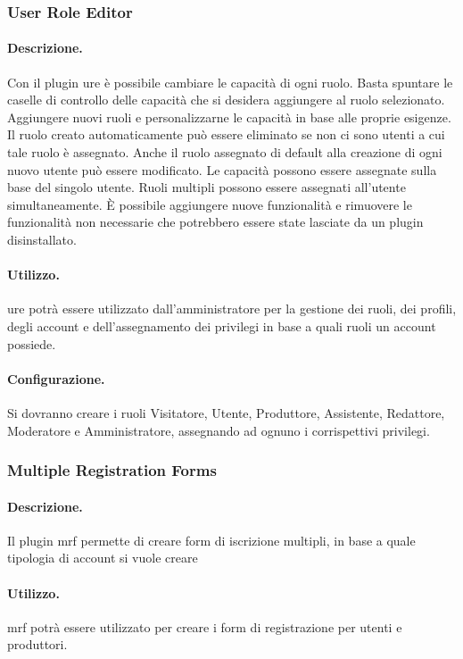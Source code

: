 \subsubsection{User Role Editor}
\paragraph{Descrizione.} Con il plugin \gls{ure} è possibile cambiare le capacità di ogni ruolo. Basta spuntare le caselle di controllo delle capacità che si desidera aggiungere al ruolo selezionato. Aggiungere nuovi ruoli e personalizzarne le capacità in base alle proprie esigenze. Il ruolo creato automaticamente può essere eliminato se non ci sono utenti a cui tale ruolo è assegnato. Anche il ruolo assegnato di default alla creazione di ogni nuovo utente può essere modificato. Le capacità possono essere assegnate sulla base del singolo utente. Ruoli multipli possono essere assegnati all'utente simultaneamente. È possibile aggiungere nuove funzionalità e rimuovere le funzionalità non necessarie che potrebbero essere state lasciate da un plugin disinstallato.
\paragraph{Utilizzo.} \gls{ure} potrà essere utilizzato dall'amministratore per la gestione dei ruoli, dei profili, degli account e dell'assegnamento dei privilegi in base a quali ruoli un account possiede.
\paragraph{Configurazione.} Si dovranno creare i ruoli Visitatore, Utente, Produttore, Assistente, Redattore, Moderatore e Amministratore, assegnando ad ognuno i corrispettivi privilegi.

\subsubsection{Multiple Registration Forms}
\paragraph{Descrizione.} Il plugin \gls{mrf} permette di creare form di iscrizione multipli, in base a quale tipologia di account si vuole creare
\paragraph{Utilizzo.}  \gls{mrf} potrà essere utilizzato per creare i form di registrazione per utenti e produttori.
